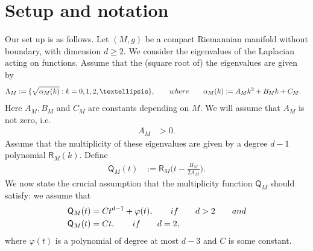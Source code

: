 \documentclass[11pt,lettersize,reqno,fullpage]{amsart}
\begin{document}
\section{Setup and notation}
\label{setup_not}
Our set up is as follows. 
Let $(M, g)$ be a compact Riemannian manifold without boundary, with dimension $d \geq 2 $.
We consider the eigenvalues of the Laplacian acting on functions. Assume that the (square root of) the 
eigenvalues are given by 
\begin{align}
\Lambda_M&:= \{ \sqrt{\alpha_M(k)}: k =0, 1, 2, \ldots \}, \qquad \textnormal{where} \qquad 
\alpha_{M}(k):= A_M k^2 + B_M k + C_M. \label{Lambda_condt}
\end{align} 
Here $A_M, B_M$ and $C_M$ are constants depending on $M$. 
We will assume that $A_M$ is not zero, i.e.  
\begin{align}
A_M&>0. \label{A_condt}
\end{align}
Assume that the multiplicity of these eigenvalues are given by a degree $d-1$ polynomial
$\mathsf{R}_{M}(k)$.
Define 
\begin{align}
\mathsf{Q}_{M}(t)&:= \mathsf{R}_{M}\Big(t-\frac{B_M}{2 A_M}\Big). \label{QM_defn}
\end{align} 
We now state the crucial assumption that the multiplicity function $\mathsf{Q}_M$ should satisfy: 
we assume that 
\begin{align}
\mathsf{Q}_{M}(t) & = C t^{d-1} + \varphi(t), \qquad \textnormal{if} \qquad d>2 \qquad \textnormal{and} \nonumber \\ 
\mathsf{Q}_{M}(t) & = C t, \qquad \textnormal{if} \qquad d=2,\label{Q_condt}
\end{align}
where $\varphi(t)$ is a polynomial of degree at most $d-3$ and 
$C$ is some constant. 
\end{document}
